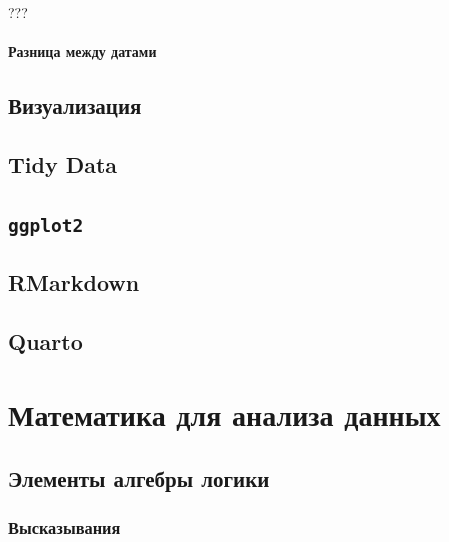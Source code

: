 \documentclass[
  letterpaper,
  DIV=11,
  numbers=noendperiod]{scrreprt}
\theoremstyle{definition}
\theoremstyle{remark}
\begin{document}
???

\subsection{Разница между датами}\label{rdates-manipulations-diff}


\chapter{Визуализация}\label{rvis}


\chapter{Tidy Data}\label{rtidy}


\chapter{\texorpdfstring{\texttt{ggplot2}}{ggplot2}}\label{rggplot2}


\chapter{RMarkdown}\label{rmarkdown}


\chapter{Quarto}\label{quarto}

\part{Математика для анализа данных}


\chapter{Элементы алгебры логики}\label{math-logic}

\section{Высказывания}\label{math-logic-utterance}
\end{document}

